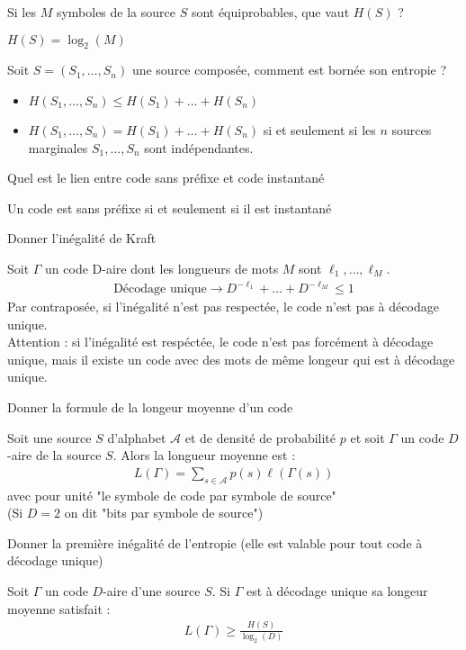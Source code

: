 \documentclass[12pt]{article}
\newcommand*{\xfield}[1]{\begin{mdframed}\centering #1\end{mdframed}\bigskip}
\newenvironment{note}{}{}
\begin{document}
\begin{note}
	\xfield{Si les $M$ symboles de la source $S$ sont équiprobables, que vaut $H(S)$ ?}
	\xfield{$H(S) = \log_2(M)$}
\end{note}

\begin{note}
	\xfield{Soit $S=(S_1,\hdots,S_n)$ une source composée, comment est bornée son entropie ?}
	\xfield{\begin{itemize}
	\item $H(S_1,\hdots,S_n) \le H(S_1) + \hdots + H(S_n)$
	\item $H(S_1,\hdots,S_n) = H(S_1) + \hdots + H(S_n)$ si et seulement si les $n$ sources marginales $S_1,\hdots,S_n$ sont indépendantes.
	\end{itemize}}
\end{note}

\begin{note}
	\xfield{Quel est le lien entre code sans préfixe et code instantané}
	\xfield{Un code est sans préfixe si et seulement si il est instantané}
\end{note}
\begin{note}
	\xfield{Donner l'inégalité de Kraft}
	\xfield{Soit $\Gamma$ un code D-aire dont les longueurs de mots $M$ sont $\ell_1,\hdots,\ell_M$.\begin{align*}
	\text{Décodage unique} \rightarrow D^{-\ell_1}+ \hdots + D^{-\ell_M} \le 1
	\end{align*}
	Par contraposée, si l'inégalité n'est pas respectée, le code n'est pas à décodage unique.\\
	Attention : si l'inégalité est respéctée, le code n'est pas forcément à décodage unique, mais il existe un code avec des mots de même longeur qui est à décodage unique.}
\end{note}
\begin{note}
	\xfield{Donner la formule de la longeur moyenne d'un code}
	\xfield{Soit une source $S$ d'alphabet $\mathcal{A}$ et de densité de probabilité $p$ et soit $\Gamma$ un code $D$-aire de la source $S$. Alors la longueur moyenne est :
	\begin{align*}
	L(\Gamma) = \sum\limits_{s \in \mathcal{A}} p(s)\ell(\Gamma(s))
	\end{align*}
	avec pour unité "le symbole de code par symbole de source"\\
	 (Si $D=2$ on dit "bits par symbole de source")}
\end{note}
\begin{note}
\xfield{Donner la première inégalité de l'entropie (elle est valable pour tout code à décodage unique)}
\xfield{Soit $\Gamma$ un code $D$-aire d'une source $S$. Si $\Gamma$ est à décodage unique sa longeur moyenne satisfait : \begin{align*}
L(\Gamma) \ge \frac{H(S)}{\log_2(D)}
\end{align*}}
\end{note}
\end{document}
